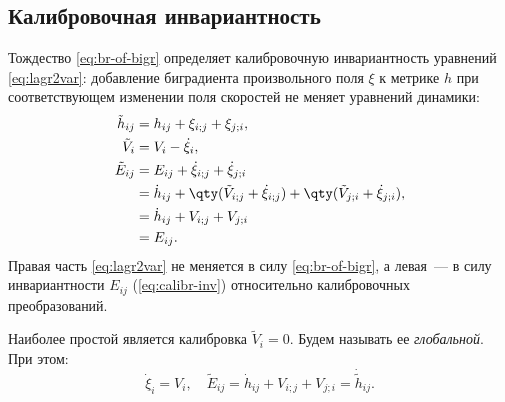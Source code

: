 \documentclass[\docroot/reports/draft/report.tex]{subfiles}
\begin{document}
\subsection{Калибровочная инвариантность}

    Тождество \ref{eq:br-of-bigr} определяет калибровочную инвариантность уравнений \ref{eq:lagr2var}: добавление биградиента произвольного поля $\xi$ к метрике $h$ при соответствующем изменении поля скоростей не меняет уравнений динамики:
    \begin{equation}\begin{aligned}\label{eq:calibr-inv}
        \tilde{h}_{ij} &= h_{ij} + \xi_{i;j} + \xi_{j;i}, \\
        \tilde{V}_i    &= V_i - \dot{\xi}_i, \\
        \tilde{E}_{ij} &= E_{ij} + \dot{\xi}_{i;j} + \dot{\xi}_{j;i} \\
                       &= \dot{h}_{ij} + \qty(\tilde{V}_{i;j} + \dot{\xi}_{i;j}) + \qty(\tilde{V}_{j;i} +  \dot{\xi}_{j;i}), \\
                       &= \dot{h}_{ij} + V_{i;j} + V_{j;i} \\
                       &= E_{ij} .
    \end{aligned}\end{equation}
    Правая часть \autoref{eq:lagr2var} не меняется в силу \autoref{eq:br-of-bigr}, а левая~--- в силу инвариантности $E_{ij}$ (\autoref{eq:calibr-inv}) относительно калибровочных преобразований.

    Наиболее простой является калибровка $\tilde{V}_i = 0$. Будем называть ее \textit{глобальной}. При этом:
    \begin{equation}\label{eq:calibr-glob}
        \dot{\xi}_i = V_i, \quad \tilde{E}_{ij} = \dot{h}_{ij} + V_{i;j} + V_{j;i} = \dot{\tilde{h}}_{ij} .
    \end{equation}
\end{document}
